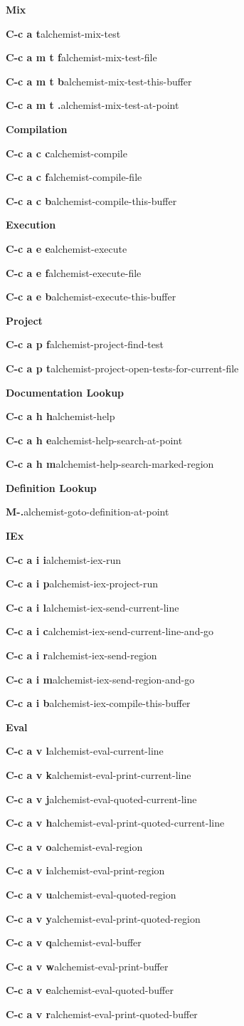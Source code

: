 \documentclass[a4paper,8pt]{article}
\newcommand{\group}[1]{\bigskip\par\noindent\textbf{\large#1}\medskip}
\newcommand{\key}[2]{\par\noindent\textbf{#1}\hfill{#2}}
\begin{document}
\begin{multicols}{2}

\group{Mix}

\key{C-c a t}{alchemist-mix-test}
\key{C-c a m t f}{alchemist-mix-test-file}
\key{C-c a m t b}{alchemist-mix-test-this-buffer}
\key{C-c a m t .}{alchemist-mix-test-at-point}

\group{Compilation}

\key{C-c a c c}{alchemist-compile}
\key{C-c a c f}{alchemist-compile-file}
\key{C-c a c b}{alchemist-compile-this-buffer}

\group{Execution}

\key{C-c a e e}{alchemist-execute}
\key{C-c a e f}{alchemist-execute-file}
\key{C-c a e b}{alchemist-execute-this-buffer}


\group{Project}

\key{C-c a p f}{alchemist-project-find-test}
\key{C-c a p t}{alchemist-project-open-tests-for-current-file}


\columnbreak

\group{Documentation Lookup}

\key{C-c a h h}{alchemist-help}
\key{C-c a h e}{alchemist-help-search-at-point}
\key{C-c a h m}{alchemist-help-search-marked-region}

\group{Definition Lookup}

\key{M-.}{alchemist-goto-definition-at-point}


\group{IEx}

\key{C-c a i i}{alchemist-iex-run}
\key{C-c a i p}{alchemist-iex-project-run}
\key{C-c a i l}{alchemist-iex-send-current-line}
\key{C-c a i c}{alchemist-iex-send-current-line-and-go}
\key{C-c a i r}{alchemist-iex-send-region}
\key{C-c a i m}{alchemist-iex-send-region-and-go}
\key{C-c a i b}{alchemist-iex-compile-this-buffer}

\group{Eval}

\key{C-c a v l}{alchemist-eval-current-line}
\key{C-c a v k}{alchemist-eval-print-current-line}
\key{C-c a v j}{alchemist-eval-quoted-current-line}
\key{C-c a v h}{alchemist-eval-print-quoted-current-line}
\key{C-c a v o}{alchemist-eval-region}
\key{C-c a v i}{alchemist-eval-print-region}
\key{C-c a v u}{alchemist-eval-quoted-region}
\key{C-c a v y}{alchemist-eval-print-quoted-region}
\key{C-c a v q}{alchemist-eval-buffer}
\key{C-c a v w}{alchemist-eval-print-buffer}
\key{C-c a v e}{alchemist-eval-quoted-buffer}
\key{C-c a v r}{alchemist-eval-print-quoted-buffer}

\end{multicols}
\end{document}
